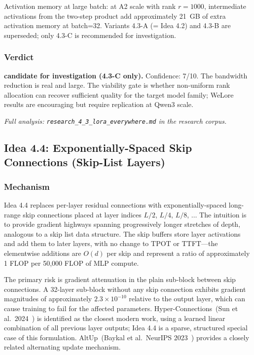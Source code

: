 \documentclass[11pt]{article}
\begin{document}
Activation memory at large batch: at A2 scale with rank $r{=}1000$, intermediate activations from the two-step product add approximately 21~GB of extra activation memory at batch=32. Variants 4.3-A (= Idea 4.2) and 4.3-B are superseded; only 4.3-C is recommended for investigation.

\subsubsection*{Verdict}

\noindent\textbf{candidate for investigation (4.3-C only).} Confidence: 7/10. The bandwidth reduction is real and large. The viability gate is whether non-uniform rank allocation can recover sufficient quality for the target model family; WeLore results are encouraging but require replication at Qwen3 scale.

\par\noindent\textit{Full analysis: \texttt{research\_4\_3\_lora\_everywhere.md} in the research corpus.}


\subsection{Idea 4.4: Exponentially-Spaced Skip Connections (Skip-List Layers)}
\label{subsec:idea44}

\subsubsection*{Mechanism}

Idea 4.4 replaces per-layer residual connections with exponentially-spaced long-range skip connections placed at layer indices $L/2$, $L/4$, $L/8$, $\ldots$ The intuition is to provide gradient highways spanning progressively longer stretches of depth, analogous to a skip list data structure. The skip buffers store layer activations and add them to later layers, with no change to TPOT or TTFT---the elementwise additions are $O(d)$ per skip and represent a ratio of approximately 1 FLOP per 50{,}000 FLOP of MLP compute.

The primary risk is gradient attenuation in the plain sub-block between skip connections. A 32-layer sub-block without any skip connection exhibits gradient magnitudes of approximately $2.3 \times 10^{-10}$ relative to the output layer, which can cause training to fail for the affected parameters. Hyper-Connections~(Sun et al.\ 2024~\cite{SunHyperConnections2024}) is identified as the closest modern work, using a learned linear combination of all previous layer outputs; Idea 4.4 is a sparse, structured special case of this formulation. AltUp~(Baykal et al.\ NeurIPS 2023~\cite{BaykalAltUp2023}) provides a closely related alternating update mechanism.
\end{document}

